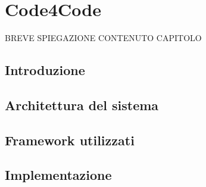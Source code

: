 \chapter{Code4Code} %
%

\begin{citazione}
BREVE SPIEGAZIONE CONTENUTO CAPITOLO
\end{citazione}

\section{Introduzione} %

\section{Architettura del sistema} %

\section{Framework utilizzati}

\section{Implementazione}

\newpage
